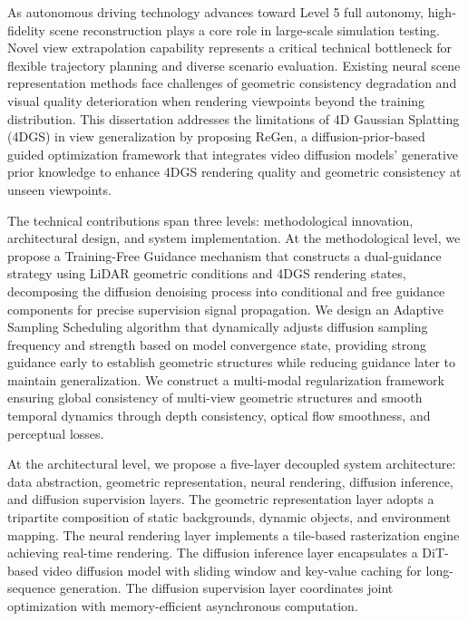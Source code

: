 \begin{abstract*}
  As autonomous driving technology advances toward Level 5 full autonomy, high-fidelity scene reconstruction plays a core role in large-scale simulation testing. Novel view extrapolation capability represents a critical technical bottleneck for flexible trajectory planning and diverse scenario evaluation. Existing neural scene representation methods face challenges of geometric consistency degradation and visual quality deterioration when rendering viewpoints beyond the training distribution. This dissertation addresses the limitations of 4D Gaussian Splatting (4DGS) in view generalization by proposing ReGen, a diffusion-prior-based guided optimization framework that integrates video diffusion models' generative prior knowledge to enhance 4DGS rendering quality and geometric consistency at unseen viewpoints.

  The technical contributions span three levels: methodological innovation, architectural design, and system implementation. At the methodological level, we propose a Training-Free Guidance mechanism that constructs a dual-guidance strategy using LiDAR geometric conditions and 4DGS rendering states, decomposing the diffusion denoising process into conditional and free guidance components for precise supervision signal propagation. We design an Adaptive Sampling Scheduling algorithm that dynamically adjusts diffusion sampling frequency and strength based on model convergence state, providing strong guidance early to establish geometric structures while reducing guidance later to maintain generalization. We construct a multi-modal regularization framework ensuring global consistency of multi-view geometric structures and smooth temporal dynamics through depth consistency, optical flow smoothness, and perceptual losses.

  At the architectural level, we propose a five-layer decoupled system architecture: data abstraction, geometric representation, neural rendering, diffusion inference, and diffusion supervision layers. The geometric representation layer adopts a tripartite composition of static backgrounds, dynamic objects, and environment mapping. The neural rendering layer implements a tile-based rasterization engine achieving real-time rendering. The diffusion inference layer encapsulates a DiT-based video diffusion model with sliding window and key-value caching for long-sequence generation. The diffusion supervision layer coordinates joint optimization with memory-efficient asynchronous computation.


\end{abstract*}
